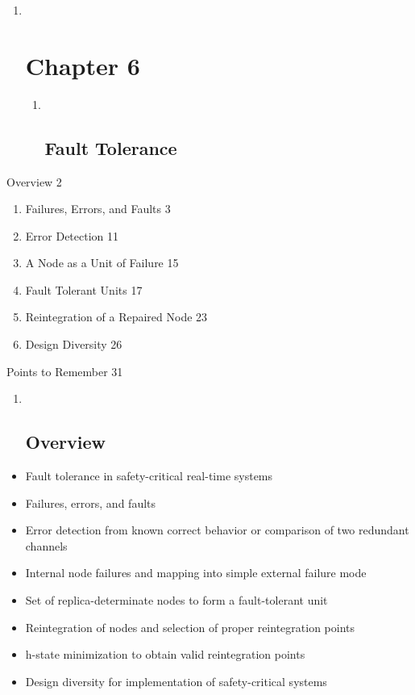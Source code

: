 \begin{enumerate}
\item ~
  \section{Chapter 6}\label{chapter-6}

  \begin{enumerate}
  \item ~
    \subsection{Fault Tolerance}\label{fault-tolerance}
  \end{enumerate}
\end{enumerate}

Overview 2

\begin{enumerate}
\def\labelenumi{\arabic{enumi}.}
\item
  Failures, Errors, and Faults 3
\item
  Error Detection 11
\item
  A Node as a Unit of Failure 15
\item
  Fault Tolerant Units 17
\item
  Reintegration of a Repaired Node 23
\item
  Design Diversity 26
\end{enumerate}

Points to Remember 31

\begin{enumerate}
\item ~
  \subsection{}\label{section}

  \subsection{Overview}\label{overview}
\end{enumerate}

\begin{itemize}
\item
  Fault tolerance in safety-critical real-time systems
\item
  Failures, errors, and faults
\item
  Error detection from known correct behavior or comparison of two
  redundant channels
\item
  Internal node failures and mapping into simple external failure mode
\item
  Set of replica-determinate nodes to form a fault-tolerant unit
\item
  Reintegration of nodes and selection of proper reintegration points
\item
  h-state minimization to obtain valid reintegration points
\item
  Design diversity for implementation of safety-critical systems
\end{itemize}

